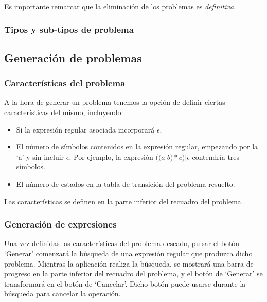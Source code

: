 
Es importante remarcar que la eliminación de los problemas es \emph{definitiva}.

\subsubsection{Tipos y sub-tipos de problema}

\subsection{Generación de problemas}

\subsubsection{Características del problema}
A la hora de generar un problema tenemos la opción de definir ciertas características del mismo, incluyendo:
\begin{itemize}
	\item Si la expresión regular asociada incorporará $ \epsilon $.
	\item El número de símbolos contenidos en la expresión regular, empezando por la `a' y sin incluir $ \epsilon $.
	Por ejemplo, la expresión $ ((a|b)*c)|\epsilon $ contendría tres símbolos.
	\item El número de estados en la tabla de transición del problema resuelto.
\end{itemize}
Las características se definen en la parte inferior del recuadro del problema.


\subsubsection{Generación de expresiones}
Una vez definidas las características del problema deseado, pulsar el botón `Generar' comenzará la búsqueda de una expresión regular que produzca dicho problema.
Mientras la aplicación realiza la búsqueda, se mostrará una barra de progreso en la parte inferior del recuadro del problema, y el botón de `Generar' se transformará en el botón de `Cancelar'.
Dicho botón puede usarse durante la búsqueda para cancelar la operación.


